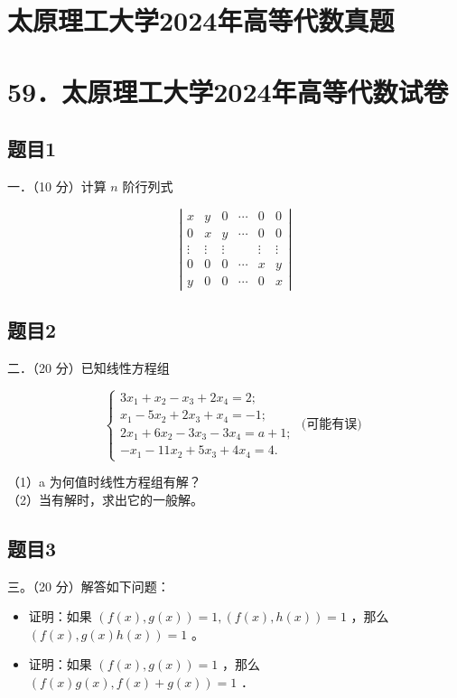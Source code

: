 \documentclass{article}
\begin{document}
\section*{太原理工大学2024年高等代数真题}
\section*{59．太原理工大学2024年高等代数试卷}

\subsection{题目1}
一．（10 分）计算 \(n\) 阶行列式

\[
\left|\begin{array}{cccccc}
x & y & 0 & \cdots & 0 & 0 \\
0 & x & y & \cdots & 0 & 0 \\
\vdots & \vdots & \vdots & & \vdots & \vdots \\
0 & 0 & 0 & \cdots & x & y \\
y & 0 & 0 & \cdots & 0 & x
\end{array}\right|
\]

\subsection{题目2}
二．（20 分）已知线性方程组

\[
\left\{\begin{array}{l}
3 x_{1}+x_{2}-x_{3}+2 x_{4}=2 ; \\
x_{1}-5 x_{2}+2 x_{3}+x_{4}=-1 ; \\
2 x_{1}+6 x_{2}-3 x_{3}-3 x_{4}=a+1 ; \\
-x_{1}-11 x_{2}+5 x_{3}+4 x_{4}=4 .
\end{array}\right. \text { (可能有误) }
\]

（1）a 为何值时线性方程组有解？\\
（2）当有解时，求出它的一般解。

\subsection{题目3}
三。（20 分）解答如下问题：

\begin{itemize}
  \item[（1）] 证明：如果 \((f(x), g(x))=1,(f(x), h(x))=1\) ，那么 \((f(x), g(x) h(x))=1\) 。
  \item[（2）] 证明：如果 \((f(x), g(x))=1\) ，那么 \((f(x) g(x), f(x)+g(x))=1\) ．
\end{itemize}
\end{document}
